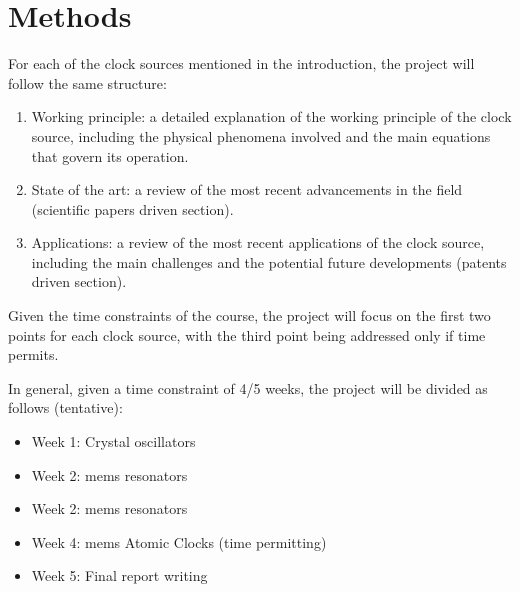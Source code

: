 \section{Methods}

For each of the clock sources mentioned in the introduction, the project will follow the same structure:

\begin{enumerate}
    \item Working principle: a detailed explanation of the working principle of the clock source, including the physical phenomena involved and the main equations that govern its operation.
    \item State of the art: a review of the most recent advancements in the field (scientific papers driven section).
    \item Applications: a review of the most recent applications of the clock source, including the main challenges and the potential future developments (patents driven section).
\end{enumerate}

Given the time constraints of the course, the project will focus on the first two points for each clock source, with the third point being addressed only if time permits.

In general, given a time constraint of 4/5 weeks, the project will be divided as follows (tentative):

\begin{itemize}
    \item Week 1: Crystal oscillators
    \item Week 2: \acrshort{mems} resonators
    \item Week 2: \acrshort{mems} resonators
    \item Week 4: \acrshort{mems} Atomic Clocks (time permitting)
    \item Week 5: Final report writing
\end{itemize}
